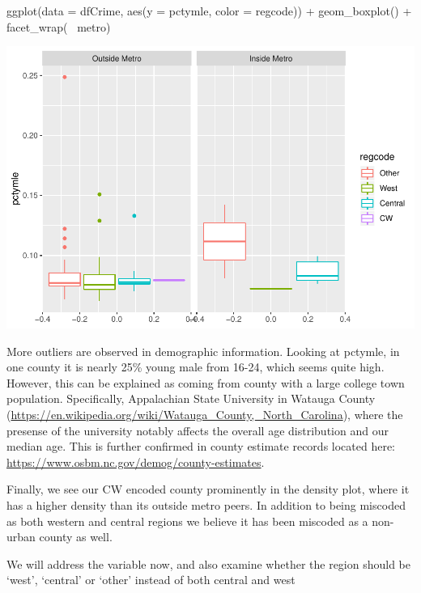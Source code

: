 \documentclass[]{article}
\newenvironment{Shaded}{}{}
\newcommand{\DataTypeTok}[1]{#1}
\newcommand{\KeywordTok}[1]{\textcolor[rgb]{0.00,0.00,1.00}{#1}}
\newcommand{\NormalTok}[1]{#1}
\newcommand{\OperatorTok}[1]{#1}
\newcommand{\StringTok}[1]{\textcolor[rgb]{0.00,0.50,0.50}{#1}}
\begin{document}
\begin{Shaded}
\begin{Highlighting}[]
\KeywordTok{ggplot}\NormalTok{(}\DataTypeTok{data =}\NormalTok{ dfCrime, }\KeywordTok{aes}\NormalTok{(}\DataTypeTok{y =}\NormalTok{ pctymle, }\DataTypeTok{color =}\NormalTok{ regcode)) }\OperatorTok{+}
\StringTok{      }\KeywordTok{geom_boxplot}\NormalTok{() }\OperatorTok{+}\StringTok{ }\KeywordTok{facet_wrap}\NormalTok{(}\OperatorTok{~}\StringTok{ }\NormalTok{metro)}
\end{Highlighting}
\end{Shaded}

\includegraphics{Bagnard_Gaustad_Hartman_Leung_Lab_3_files/figure-latex/unnamed-chunk-27-3.pdf}

More outliers are observed in demographic information. Looking at
pctymle, in one county it is nearly 25\% young male from 16-24, which
seems quite high. However, this can be explained as coming from county
with a large college town population. Specifically, Appalachian State
University in Watauga County
(\url{https://en.wikipedia.org/wiki/Watauga_County,_North_Carolina}),
where the presense of the university notably affects the overall age
distribution and our median age. This is further confirmed in county
estimate records located here:
\url{https://www.osbm.nc.gov/demog/county-estimates}.

Finally, we see our CW encoded county prominently in the density plot,
where it has a higher density than its outside metro peers. In addition
to being miscoded as both western and central regions we believe it has
been miscoded as a non-urban county as well.

We will address the variable now, and also examine whether the region
should be `west', `central' or `other' instead of both central and west
\end{document}

